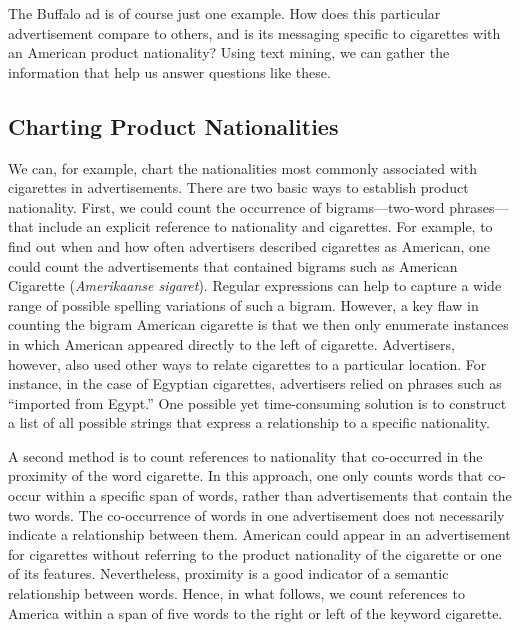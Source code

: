 \documentclass[USenglish]{article}
\begin{document}
The Buffalo ad is of course just one example. How does this particular advertisement compare to others, and is its messaging specific to cigarettes with an American product nationality? Using text mining, we can gather the information that help us answer questions like these. 

\subsection{Charting Product Nationalities}
We can, for example, chart the nationalities most commonly associated with cigarettes in advertisements. There are two basic ways to establish product nationality. First, we could count the occurrence of bigrams---two-word phrases---that include an explicit reference to nationality and cigarettes. For example, to find out when and how often advertisers described cigarettes as American, one could count the advertisements that contained bigrams such as American Cigarette (\textit{Amerikaanse sigaret}). Regular expressions can help to capture a wide range of possible spelling variations of such a bigram. However, a key flaw in counting the bigram American cigarette is that we then only enumerate instances in which American appeared directly to the left of cigarette. Advertisers, however, also used other ways to relate cigarettes to a particular location. For instance, in the case of Egyptian cigarettes, advertisers relied on phrases such as ``imported from Egypt.'' One possible yet time-consuming solution is to construct a list of all possible strings that express a relationship to a specific nationality. 

A second method is to count references to nationality that co-occurred in the  proximity of the word cigarette. In this approach, one only counts words that co-occur within a specific span of words, rather than advertisements that contain the two words. The co-occurrence of words in one advertisement does not necessarily indicate a relationship between them. American could appear in an advertisement for cigarettes without referring to the product nationality of the cigarette or one of its features. Nevertheless, proximity is a good indicator of a semantic relationship between words.  Hence, in what follows, we count references to America within a span of five words to the right or left of the keyword cigarette. 
\end{document}
